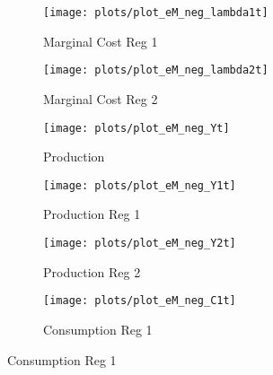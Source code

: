 \documentclass[../thesis.tex]{subfiles}
\begin{document}
\begin{figure}[h!]
\begin{subfigure}[b]{0.27\textwidth}
		\label{fig:eM-neg-K2t}
	\end{subfigure}
	\vspace*{0.1cm}
	\begin{subfigure}[b]{0.27\textwidth}
		\centering
		\texttt{[image: plots/plot\_eM\_neg\_lambda1t]}
		\caption{\scriptsize Marginal Cost Reg 1}
		\label{fig:eM-neg-lambda1t}
	\end{subfigure}
	\hspace*{0.5cm}
	\begin{subfigure}[b]{0.27\textwidth}
		\centering
		\texttt{[image: plots/plot\_eM\_neg\_lambda2t]}
		\caption{\scriptsize Marginal Cost Reg 2}
		\label{fig:eM-neg-lambda2t}
	\end{subfigure}
	\hspace*{0.5cm}
	\begin{subfigure}[b]{0.27\textwidth}
		\centering
		\texttt{[image: plots/plot\_eM\_neg\_Yt]}
		\caption{\scriptsize Production}
		\label{fig:eM-neg-Yt}
	\end{subfigure}
	\vspace*{0.1cm}
	\begin{subfigure}[b]{0.27\textwidth}
		\centering
		\texttt{[image: plots/plot\_eM\_neg\_Y1t]}
		\caption{\scriptsize Production Reg 1}
		\label{fig:eM-neg-Y1t}
	\end{subfigure}
	\hspace*{0.5cm}
	\begin{subfigure}[b]{0.27\textwidth}
		\centering
		\texttt{[image: plots/plot\_eM\_neg\_Y2t]}
		\caption{\scriptsize Production Reg 2}
		\label{fig:eM-neg-Y2t}
	\end{subfigure}
	\hspace*{0.5cm}
	\begin{subfigure}[b]{0.27\textwidth}
		\centering
		\texttt{[image: plots/plot\_eM\_neg\_C1t]}
		\caption{\scriptsize Consumption Reg 1}
		\label{fig:eM-neg-C1t}
	\end{subfigure}

\end{figure}
\end{document}
